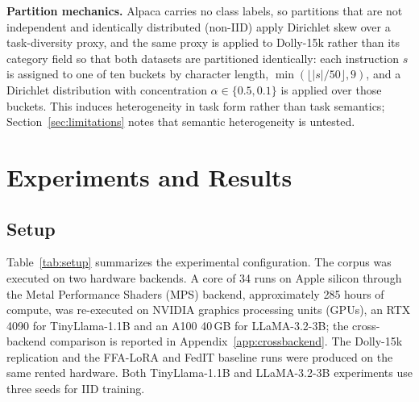 \textbf{Partition mechanics.}
Alpaca carries no class labels, so partitions that are not independent and identically distributed (non-IID) apply Dirichlet skew over a task-diversity proxy, and the same proxy is applied to Dolly-15k rather than its category field so that both datasets are partitioned identically: each instruction $s$ is assigned to one of ten buckets by character length, $\min(\lfloor |s| / 50 \rfloor, 9)$, and a Dirichlet distribution with concentration $\alpha \in \{0.5, 0.1\}$ is applied over those buckets. This induces heterogeneity in task form rather than task semantics; Section~\ref{sec:limitations} notes that semantic heterogeneity is untested.

\section{Experiments and Results}
\label{sec:experiments}

\subsection{Setup}
\label{sec:setup}
Table~\ref{tab:setup} summarizes the experimental configuration. The corpus was executed on two hardware backends. A core of 34 runs on Apple silicon through the Metal Performance Shaders (MPS) backend, approximately 285 hours of compute, was re-executed on NVIDIA graphics processing units (GPUs), an RTX 4090 for TinyLlama-1.1B and an A100 40\,GB for LLaMA-3.2-3B; the cross-backend comparison is reported in Appendix~\ref{app:crossbackend}. The Dolly-15k replication and the FFA-LoRA and FedIT baseline runs were produced on the same rented hardware. Both TinyLlama-1.1B and LLaMA-3.2-3B experiments use three seeds for IID training.

